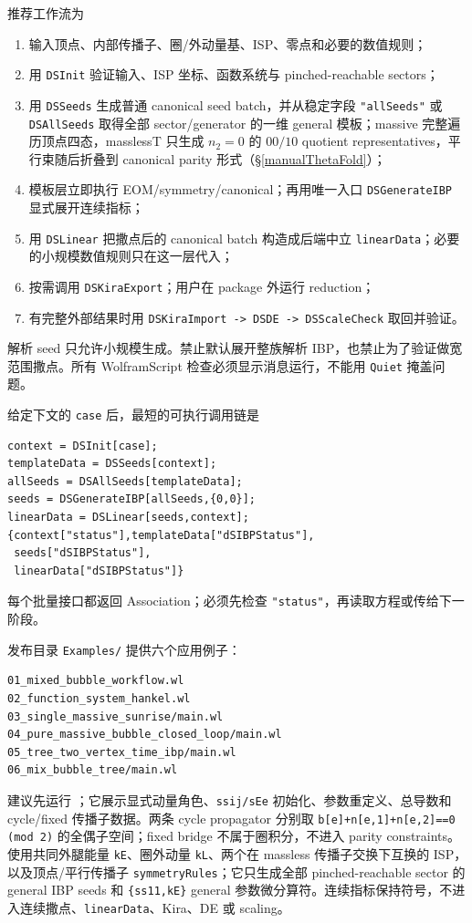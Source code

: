 ﻿\documentclass[a4paper,11pt]{article}
\begin{document}
推荐工作流为
\begin{enumerate}
  \item 输入顶点、内部传播子、圈/外动量基、ISP、零点和必要的数值规则；
  \item 用 \texttt{DSInit} 验证输入、ISP 坐标、函数系统与 pinched-reachable sectors；
  \item 用 \texttt{DSSeeds} 生成普通 canonical seed batch，并从稳定字段 \texttt{"allSeeds"} 或 \texttt{DSAllSeeds} 取得全部 sector/generator 的一维 general 模板；massive 完整遍历顶点四态，masslessT 只生成 $n_2=0$ 的 $00/10$ quotient representatives，平行束随后折叠到 canonical parity 形式（\S\ref{manualThetaFold}）；
  \item 模板层立即执行 EOM/symmetry/canonical；再用唯一入口 \texttt{DSGenerateIBP} 显式展开连续指标；
  \item 用 \texttt{DSLinear} 把撒点后的 canonical batch 构造成后端中立 \texttt{linearData}；必要的小规模数值规则只在这一层代入；
  \item 按需调用 \texttt{DSKiraExport}；用户在 package 外运行 reduction；
  \item 有完整外部结果时用 \texttt{DSKiraImport -> DSDE -> DSScaleCheck} 取回并验证。
\end{enumerate}

\begin{proofbox}
解析 seed 只允许小规模生成。禁止默认展开整族解析 IBP，也禁止为了验证做宽范围撒点。所有 WolframScript 检查必须显示消息运行，不能用 \texttt{Quiet} 掩盖问题。
\end{proofbox}

给定下文的 \texttt{case} 后，最短的可执行调用链是
\begin{verbatim}
context = DSInit[case];
templateData = DSSeeds[context];
allSeeds = DSAllSeeds[templateData];
seeds = DSGenerateIBP[allSeeds,{0,0}];
linearData = DSLinear[seeds,context];
{context["status"],templateData["dSIBPStatus"],
 seeds["dSIBPStatus"],
 linearData["dSIBPStatus"]}
\end{verbatim}
每个批量接口都返回 Association；必须先检查 \texttt{"status"}，再读取方程或传给下一阶段。

发布目录 \texttt{Examples/} 提供六个应用例子：
\begin{verbatim}
01_mixed_bubble_workflow.wl
02_function_system_hankel.wl
03_single_massive_sunrise/main.wl
04_pure_massive_bubble_closed_loop/main.wl
05_tree_two_vertex_time_ibp/main.wl
06_mix_bubble_tree/main.wl
\end{verbatim}
建议先运行 ；它展示显式动量角色、\texttt{ssij/sEe} 初始化、参数重定义、总导数和 cycle/fixed 传播子数据。两条 cycle propagator 分别取
\texttt{b[e]+n[e,1]+n[e,2]==0 (mod 2)} 的全偶子空间；fixed bridge 不属于圈积分，不进入 parity constraints。 使用共同外腿能量 \texttt{kE}、圈外动量 \texttt{kL}、两个在 massless 传播子交换下互换的 ISP，以及顶点/平行传播子 \texttt{symmetryRules}；它只生成全部 pinched-reachable sector 的 general IBP seeds 和 \texttt{\{ss11,kE\}} general 参数微分算符。连续指标保持符号，不进入连续撒点、\texttt{linearData}、Kira、DE 或 scaling。
\end{document}
